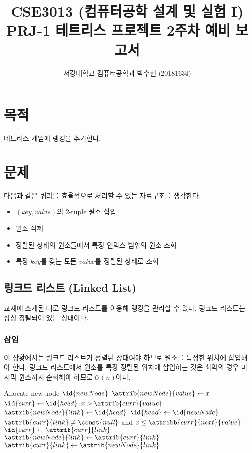 
    
\usepackage{subfig}



\title{CSE3013 (컴퓨터공학 설계 및 실험 I) \space \newline PRJ-1 테트리스 프로젝트 2주차 예비 보고서}
\author{서강대학교 컴퓨터공학과 박수현 (20181634)}
\maketitle

\section{목적}
테트리스 게임에 랭킹을 추가한다.

\section{문제}
다음과 같은 쿼리를 효율적으로 처리할 수 있는 자료구조를 생각한다.
\begin{itemize}
    \item $(key, value)$의 2-tuple 원소 삽입
    \item 원소 삭제
    \item 정렬된 상태의 원소들에서 특정 인덱스 범위의 원소 조회
    \item 특정 $key$를 갖는 모든 $value$를 정렬된 상태로 조회
\end{itemize}

\subsection{링크드 리스트 (Linked List)}
교재에 소개된 대로 링크드 리스트를 이용해 랭킹을 관리할 수 있다. 링크드 리스트는 항상 정렬되어 있는 상태이다.

\subsubsection{삽입} 이 상황에서는 링크드 리스트가 정렬된 상태여야 하므로 원소를 특정한 위치에 삽입해야 한다.
링크드 리스트에서 원소를 특정 정렬된 위치에 삽입하는 것은 최악의 경우 마지막 원소까지 순회해야 하므로 $\mathcal{O}\left(n\right)$이다.

\begin{codebox}
\li Allocate new node $\id{newNode}$
\li $\attrib{newNode}{value} \gets x$
\li $\id{curr} \gets \id{head}$
\li \If $x > \attrib{curr}{value}$ \Then
\li     $\attrib{newNode}{link} \gets \id{head}$
\li     $\id{head} \gets \id{newNode}$
\li \Else
\li     \While $\attrib{curr}{link} \neq \const{null}$ and $x \leq \attribb{curr}{next}{value}$ \Do
\li         $\id{curr} \gets \attrib{curr}{link}$
        \End
\li $\attrib{newNode}{link} \gets \attrib{curr}{link}$
\li $\attrib{curr}{link} \gets\attrib{newNode}{link}$
    \End
\end{codebox}

